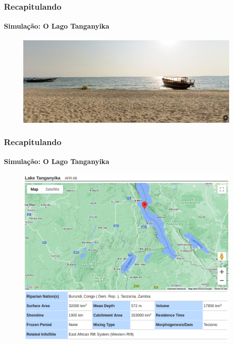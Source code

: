 \documentclass[aspectratio=169]{beamer} %
\begin{document}
{{\begin{frame}
\frametitle{Recapitulando}
	\framesubtitle{Simulação: O Lago Tanganyika}
	\pause
	\begin{figure}
		\centering
		\includegraphics[scale=0.15]{images/Tanganyika2.png}
	\end{figure}
\end{frame} 
}

{
\begin{frame}

\frametitle{Recapitulando}
	\framesubtitle{Simulação: O Lago Tanganyika}
	\pause
	\begin{figure}
		\centering
		\includegraphics[scale=0.25]{images/Tanganyika3.png}
	\end{figure}
\end{frame} 
}

}
\end{document}
